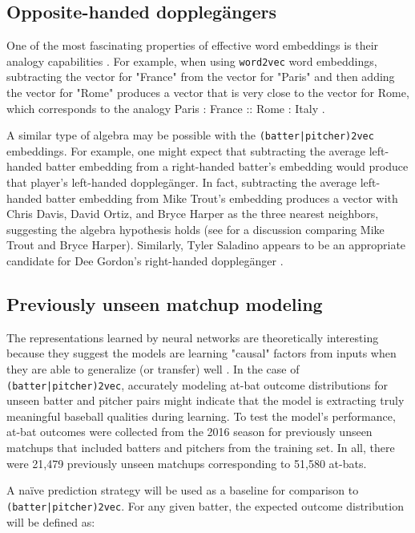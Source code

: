\documentclass{article}
\begin{document}
\subsection{Opposite-handed dopplegängers}

One of the most fascinating properties of effective word embeddings is their analogy capabilities \parencite{Mikolov2013a}. For example, when using \texttt{word2vec} word embeddings, subtracting the vector for "France" from the vector for "Paris" and then adding the vector for "Rome" produces a vector that is very close to the vector for Rome, which corresponds to the analogy Paris : France :: Rome : Italy \parencite{Mikolov2013a}.

A similar type of algebra may be possible with the \texttt{(batter|pitcher)2vec} embeddings. For example, one might expect that subtracting the average left-handed batter embedding from a right-handed batter's embedding would produce that player's left-handed dopplegänger. In fact, subtracting the average left-handed batter embedding from Mike Trout's embedding produces a vector with Chris Davis, David Ortiz, and Bryce Harper as the three nearest neighbors, suggesting the algebra hypothesis holds (see \parencite{Spector2016} for a discussion comparing Mike Trout and Bryce Harper). Similarly, Tyler Saladino appears to be an appropriate candidate for Dee Gordon's right-handed dopplegänger \parencite{Chamberlain2017}.

\subsection{Previously unseen matchup modeling}

The representations learned by neural networks are theoretically interesting because they suggest the models are learning "causal" factors from inputs when they are able to generalize (or transfer) well \parencite{RepresentationLearning}. In the case of \texttt{(batter|pitcher)2vec}, accurately modeling at-bat outcome distributions for unseen batter and pitcher pairs might indicate that the model is extracting truly meaningful baseball qualities during learning. To test the model's performance, at-bat outcomes were collected from the 2016 season for previously unseen matchups that included batters and pitchers from the training set. In all, there were 21,479 previously unseen matchups corresponding to 51,580 at-bats.

A naïve prediction strategy will be used as a baseline for comparison to \texttt{(batter|pitcher)2vec}. For any given batter, the expected outcome distribution will be defined as:
\end{document}
